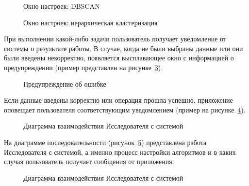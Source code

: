 \begin{figure}[H]
    \caption{Окно настроек: DBSCAN}
    \label{ris:settings_window_01}
\end{figure}


\begin{figure}[H]
    \caption{Окно настроек: иерархическая кластеризация}
    \label{ris:settings_window_02}
\end{figure}


При выполнении какой-либо задачи пользователь получает уведомление от системы о результате работы. В случае, когда не были выбраны данные или они были введены некорректно, появляется высплавающее окно с информацией о предупреждении (пример представлен на рисунке~\ref{ris:warning}).


\begin{figure}[H]
    \caption{Предупреждение об ошибке}
    \label{ris:warning}
\end{figure}

Если данные введены корректно или операция прошла успешно, приложение оповещает пользователя соответствующим уведомлением (пример на рисунке~\ref{ris:info}).

\begin{figure}[H]
    \caption{Диаграмма взаимодействия Исследователя с системой}
    \label{ris:info}
\end{figure}


На диаграмме последовательности (рисунок~\ref{ris:diag_posl}) представлена работа Исследователя с системой, а именно процесс настройки алгоритмов и в каких случая пользователь получает сообщения от приложения.


\begin{figure}[H]
    \caption{Диаграмма взаимодействия Исследователя с системой}
    \label{ris:diag_posl}
\end{figure}



